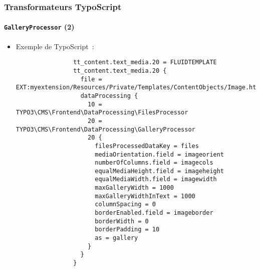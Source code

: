 \begin{frame}[fragile]
	\frametitle{Transformateurs TypoScript}
	\framesubtitle{\texttt{GalleryProcessor} (2)}

	\lstset{basicstyle=\tiny\ttfamily}

	\begin{itemize}

		\item Exemple de TypoScript~:

			\begin{lstlisting}
				tt_content.text_media.20 = FLUIDTEMPLATE
				tt_content.text_media.20 {
				  file = EXT:myextension/Resources/Private/Templates/ContentObjects/Image.html
				  dataProcessing {
				    10 = TYPO3\CMS\Frontend\DataProcessing\FilesProcessor
				    20 = TYPO3\CMS\Frontend\DataProcessing\GalleryProcessor
				    20 {
				      filesProcessedDataKey = files
				      mediaOrientation.field = imageorient
				      numberOfColumns.field = imagecols
				      equalMediaHeight.field = imageheight
				      equalMediaWidth.field = imagewidth
				      maxGalleryWidth = 1000
				      maxGalleryWidthInText = 1000
				      columnSpacing = 0
				      borderEnabled.field = imageborder
				      borderWidth = 0
				      borderPadding = 10
				      as = gallery
				    }
				  }
				}
			\end{lstlisting}

	\end{itemize}

\end{frame}


